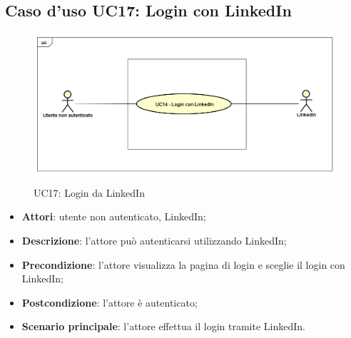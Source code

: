 \newpage
\subsection{Caso d'uso UC17: Login con LinkedIn}
\label{UC17}
\begin{figure}
	\centering
	\includegraphics[scale=0.48]{UML/UC17.png}
	\caption{UC17: Login da LinkedIn}
\end{figure}
\FloatBarrier
\begin{itemize}
	\item \textbf{Attori}: utente non autenticato, LinkedIn;
	\item \textbf{Descrizione}: l'attore può autenticarsi utilizzando LinkedIn;
	\item \textbf{Precondizione}: l'attore visualizza la pagina di login e sceglie il login con LinkedIn;
	\item \textbf{Postcondizione}: l'attore è autenticato;
	\item \textbf{Scenario principale}: l'attore effettua il login tramite LinkedIn.
\end{itemize}